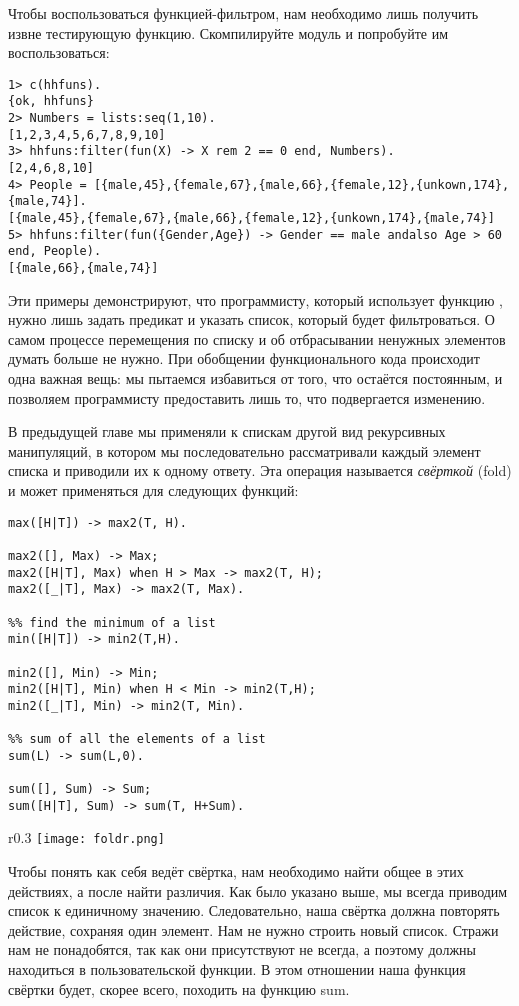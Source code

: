 Чтобы воспользоваться функцией\--фильтром, нам необходимо лишь получить извне тестирующую функцию. Скомпилируйте модуль  и попробуйте им воспользоваться:
\begin{lstlisting}[style=erlang]
1> c(hhfuns).
{ok, hhfuns}
2> Numbers = lists:seq(1,10).
[1,2,3,4,5,6,7,8,9,10]
3> hhfuns:filter(fun(X) -> X rem 2 == 0 end, Numbers).
[2,4,6,8,10]
4> People = [{male,45},{female,67},{male,66},{female,12},{unkown,174},{male,74}].
[{male,45},{female,67},{male,66},{female,12},{unkown,174},{male,74}]
5> hhfuns:filter(fun({Gender,Age}) -> Gender == male andalso Age > 60 end, People).
[{male,66},{male,74}]
\end{lstlisting}

Эти примеры демонстрируют, что программисту, который использует функцию , нужно лишь задать предикат и указать список, который будет фильтроваться. О самом процессе перемещения по списку и об отбрасывании ненужных элементов думать больше не нужно. При обобщении функционального кода происходит одна важная вещь: мы пытаемся избавиться от того, что остаётся постоянным, и позволяем программисту предоставить лишь то, что подвергается изменению.

В предыдущей главе мы применяли к спискам другой вид рекурсивных манипуляций, в котором мы последовательно рассматривали каждый элемент списка и приводили их к одному ответу. Эта операция называется \emph{свёрткой} (fold) и может применяться для следующих функций:
\begin{lstlisting}[style=erlang]
%% find the maximum of a list
max([H|T]) -> max2(T, H).
 
max2([], Max) -> Max;
max2([H|T], Max) when H > Max -> max2(T, H);
max2([_|T], Max) -> max2(T, Max).
 
%% find the minimum of a list
min([H|T]) -> min2(T,H).
 
min2([], Min) -> Min;
min2([H|T], Min) when H < Min -> min2(T,H);
min2([_|T], Min) -> min2(T, Min).
 
%% sum of all the elements of a list
sum(L) -> sum(L,0).
 
sum([], Sum) -> Sum;
sum([H|T], Sum) -> sum(T, H+Sum).
\end{lstlisting}
\begin{wrapfigure}{r}{0.3\linewidth}
    \texttt{[image: foldr.png]}
\end{wrapfigure}

Чтобы понять как себя ведёт свёртка, нам необходимо найти общее в этих действиях, а после найти различия. Как было указано выше, мы всегда приводим список к единичному значению. Следовательно, наша свёртка должна повторять действие, сохраняя один элемент. Нам не нужно строить новый список. Стражи нам не понадобятся, так как они присутствуют не всегда, а поэтому должны находиться в пользовательской функции. В этом отношении наша функция свёртки будет, скорее всего, походить на функцию sum.

